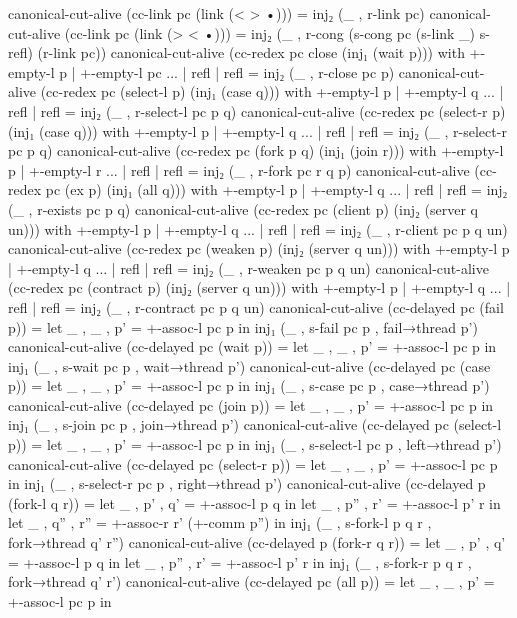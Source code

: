 \begin{code}[hide]
canonical-cut-alive (cc-link pc (link (< > •))) = inj₂ (_ , r-link pc)
canonical-cut-alive (cc-link pc (link (> < •))) =
  inj₂ (_ , r-cong (s-cong pc (s-link _) s-refl) (r-link pc))
canonical-cut-alive (cc-redex pc close (inj₁ (wait p))) with +-empty-l p | +-empty-l pc
... | refl | refl = inj₂ (_ , r-close pc p)
canonical-cut-alive (cc-redex pc (select-l p) (inj₁ (case q))) with +-empty-l p | +-empty-l q
... | refl | refl = inj₂ (_ , r-select-l pc p q)
canonical-cut-alive (cc-redex pc (select-r p) (inj₁ (case q))) with +-empty-l p | +-empty-l q
... | refl | refl = inj₂ (_ , r-select-r pc p q)
canonical-cut-alive (cc-redex pc (fork p q) (inj₁ (join r))) with +-empty-l p | +-empty-l r
... | refl | refl = inj₂ (_ , r-fork pc r q p)
canonical-cut-alive (cc-redex pc (ex p) (inj₁ (all q))) with +-empty-l p | +-empty-l q
... | refl | refl = inj₂ (_ , r-exists pc p q)
canonical-cut-alive (cc-redex pc (client p) (inj₂ (server q un))) with +-empty-l p | +-empty-l q
... | refl | refl = inj₂ (_ , r-client pc p q un)
canonical-cut-alive (cc-redex pc (weaken p) (inj₂ (server q un))) with +-empty-l p | +-empty-l q
... | refl | refl = inj₂ (_ , r-weaken pc p q un)
canonical-cut-alive (cc-redex pc (contract p) (inj₂ (server q un))) with +-empty-l p | +-empty-l q
... | refl | refl = inj₂ (_ , r-contract pc p q un)
canonical-cut-alive (cc-delayed pc (fail p)) =
  let _ , _ , p' = +-assoc-l pc p in
  inj₁ (_ , s-fail pc p , fail→thread p')
canonical-cut-alive (cc-delayed pc (wait p)) =
  let _ , _ , p' = +-assoc-l pc p in
  inj₁ (_ , s-wait pc p , wait→thread p')
canonical-cut-alive (cc-delayed pc (case p)) =
  let _ , _ , p' = +-assoc-l pc p in
  inj₁ (_ , s-case pc p , case→thread p')
canonical-cut-alive (cc-delayed pc (join p)) =
  let _ , _ , p' = +-assoc-l pc p in
  inj₁ (_ , s-join pc p , join→thread p')
canonical-cut-alive (cc-delayed pc (select-l p)) =
  let _ , _ , p' = +-assoc-l pc p in
  inj₁ (_ , s-select-l pc p , left→thread p')
canonical-cut-alive (cc-delayed pc (select-r p)) =
  let _ , _ , p' = +-assoc-l pc p in
  inj₁ (_ , s-select-r pc p , right→thread p')
canonical-cut-alive (cc-delayed p (fork-l q r)) =
  let _ , p' , q' = +-assoc-l p q in
  let _ , p'' , r' = +-assoc-l p' r in
  let _ , q'' , r'' = +-assoc-r r' (+-comm p'') in
  inj₁ (_ , s-fork-l p q r , fork→thread q' r'')
canonical-cut-alive (cc-delayed p (fork-r q r)) =
  let _ , p' , q' = +-assoc-l p q in
  let _ , p'' , r' = +-assoc-l p' r in
  inj₁ (_ , s-fork-r p q r , fork→thread q' r')
canonical-cut-alive (cc-delayed pc (all p)) =
  let _ , _ , p' = +-assoc-l pc p in

\end{code}
